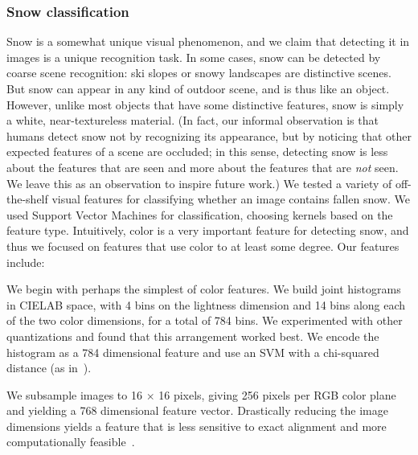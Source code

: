 \subsubsection*{Snow classification}
\label{sec:snow}

Snow is a somewhat unique visual phenomenon, and we claim that
detecting it in images is a unique recognition task. In some cases,
snow can be detected by coarse scene recognition: ski slopes or snowy
landscapes are distinctive scenes. But snow can appear in any kind of
outdoor scene, and is thus like an object. However, unlike most
objects that have some distinctive features, snow is simply a white,
near-textureless material.  (In fact, our informal observation is that
humans detect snow not by recognizing its appearance, but by noticing
that other expected features of a scene are occluded; in this sense,
detecting snow is less about the features that are seen and more about
the features that are \textit{not} seen. We leave this as an
observation to inspire future work.)
%
We tested a variety of off-the-shelf visual features for classifying
whether an image contains fallen snow. We used Support Vector
Machines for classification, choosing kernels based on the feature
type.  Intuitively, color is a very important feature for detecting
snow, and thus we focused on features that use color to at least some
degree. Our features include:


 We begin with perhaps the simplest of color
features. We build joint histograms in CIELAB space, with 4 bins on
the lightness dimension and 14 bins along each of the two color
dimensions, for a total of 784 bins. We experimented with other
quantizations and found that this arrangement worked best.  We encode
the histogram as a 784 dimensional feature and use an SVM with a
chi-squared distance (as in~\cite{XiaoHEOT10}).

We subsample images to 16 $\times$ 16 pixels, giving 256 pixels per
RGB color plane and yielding a 768 dimensional feature vector.
Drastically reducing the image dimensions yields a feature that is
less sensitive to exact alignment and more computationally
feasible~\cite{torralba2008tiny}.  


